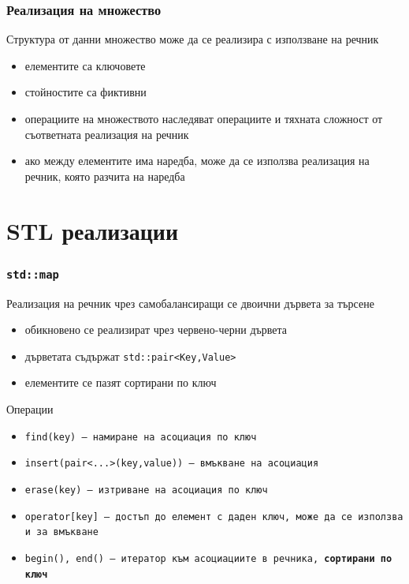 \documentclass[alsotrans]{beamerswitch}
\begin{document}
\begin{frame}
  \frametitle{Реализация на множество}
  Структура от данни множество може да се реализира с използване на речник
  \begin{itemize}
  \item елементите са ключовете
  \item стойностите са фиктивни
  \item операциите на множеството наследяват операциите и тяхната сложност от съответната реализация на речник
  \item ако между елементите има наредба, може да се използва реализация на речник, която разчита на наредба
  \end{itemize}
\end{frame}

\section{STL реализации}

\begin{frame}
  \frametitle{\tt{std::map}}
  Реализация на речник чрез самобалансиращи се двоични дървета за търсене
  \begin{itemize}
  \item обикновено се реализират чрез червено-черни дървета
  \item дърветата съдържат \tt{std::pair<Key,Value>}
  \item елементите се пазят сортирани по ключ
  \end{itemize}
  Операции
  \begin{itemize}
  \item \tt{find(key)} --- намиране на асоциация по ключ
  \item \tt{insert(pair<...>(key,value))} --- вмъкване на асоциация
  \item \tt{erase(key)} --- изтриване на асоциация по ключ
  \item \tt{operator[key]} --- достъп до елемент с даден ключ, може да се използва и за вмъкване
  \item \tt{begin(), end()} --- итератор към асоциациите в речника, \textbf{сортирани по ключ}
  \end{itemize}
\end{frame}
\end{document}
